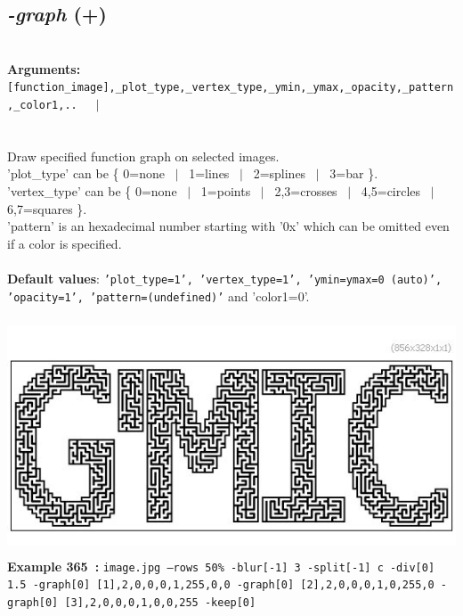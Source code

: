 \documentclass[a4paper,11pt,twoside]{book}
\begin{document}
\subsection{\emph{-graph} (+)}\vspace*{-0.5em}
~\\\textbf{Arguments: } 
{\small \texttt{[function\_image],\_plot\_type,\_vertex\_type,\_ymin,\_ymax,\_opacity,\_pattern,\_color1,..}}~~~$|$\\
\\~\\
Draw specified function graph on selected images.
~\\'plot\_type' can be \{ 0=none ~$|$~ 1=lines ~$|$~ 2=splines ~$|$~ 3=bar \}.
~\\'vertex\_type' can be \{ 0=none ~$|$~ 1=points ~$|$~ 2,3=crosses ~$|$~ 4,5=circles ~$|$~ 6,7=squares \}.
~\\'pattern' is an hexadecimal number starting with '0x' which can be omitted
even if a color is specified.
~\\~\\\textbf{Default values}: {\small \texttt{'plot\_type=1', 'vertex\_type=1', 'ymin=ymax=0 (auto)', 'opacity=1', 'pattern=(undefined)'}}
and 'color1=0'.
\begin{center}\includegraphics[keepaspectratio=true,height=7cm,width=\textwidth]{img/gmic_def365.jpg}\\
{\footnotesize \textbf{Example 365~:} \texttt{image.jpg --rows 50\% -blur[-1] 3 -split[-1] c -div[0] 1.5 -graph[0] [1],2,0,0,0,1,255,0,0 -graph[0] [2],2,0,0,0,1,0,255,0 -graph[0] [3],2,0,0,0,1,0,0,255 -keep[0]}}
\end{center}
\end{document}

